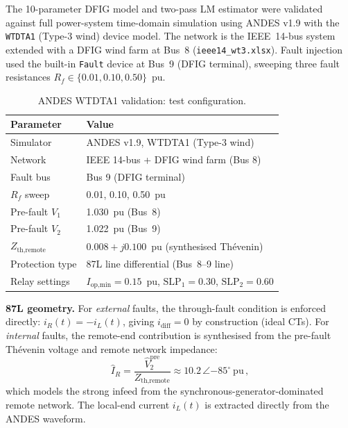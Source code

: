\documentclass[11pt,a4paper]{article}
\begin{document}
The 10-parameter DFIG model and two-pass LM estimator were validated against
full power-system time-domain simulation using ANDES v1.9 with the
\texttt{WTDTA1} (Type-3 wind) device model.  The network is the IEEE~14-bus
system extended with a DFIG wind farm at Bus~8 (\texttt{ieee14\_wt3.xlsx}).
Fault injection used the built-in \texttt{Fault} device at Bus~9 (DFIG
terminal), sweeping three fault resistances $R_f \in \{0.01, 0.10, 0.50\}$~pu.

\begin{table}[ht]
  \centering
  \caption{ANDES WTDTA1 validation: test configuration.}
  \label{tab:andes_config}
  \begin{tabular}{ll}
    \toprule
    Parameter & Value \\
    \midrule
    Simulator       & ANDES v1.9, WTDTA1 (Type-3 wind) \\
    Network         & IEEE 14-bus + DFIG wind farm (Bus 8) \\
    Fault bus       & Bus 9 (DFIG terminal) \\
    $R_f$ sweep     & 0.01, 0.10, 0.50~pu \\
    Pre-fault $V_1$ & 1.030~pu (Bus~8) \\
    Pre-fault $V_2$ & 1.022~pu (Bus~9) \\
    $Z_\text{th,remote}$ & $0.008 + j0.100$~pu (synthesised Thévenin) \\
    Protection type & 87L line differential (Bus~8--9 line) \\
    Relay settings  & $I_\text{op,min}=0.15$~pu, $\text{SLP}_1=0.30$, $\text{SLP}_2=0.60$ \\
    \bottomrule
  \end{tabular}
\end{table}

\noindent\textbf{87L geometry.}
For \emph{external} faults, the through-fault condition is enforced directly:
$i_R(t) = -i_L(t)$, giving $i_\text{diff} = 0$ by construction (ideal CTs).
For \emph{internal} faults, the remote-end contribution is synthesised from the
pre-fault Thévenin voltage and remote network impedance:
\begin{equation}
  \hat{I}_R = \frac{\hat{V}_2^{\text{pre}}}{Z_{\text{th,remote}}}
  \approx 10.2\,\angle{-85^\circ}~\text{pu}\,,
\end{equation}
which models the strong infeed from the synchronous-generator-dominated
remote network.  The local-end current $i_L(t)$ is extracted directly from
the ANDES waveform.
\end{document}
